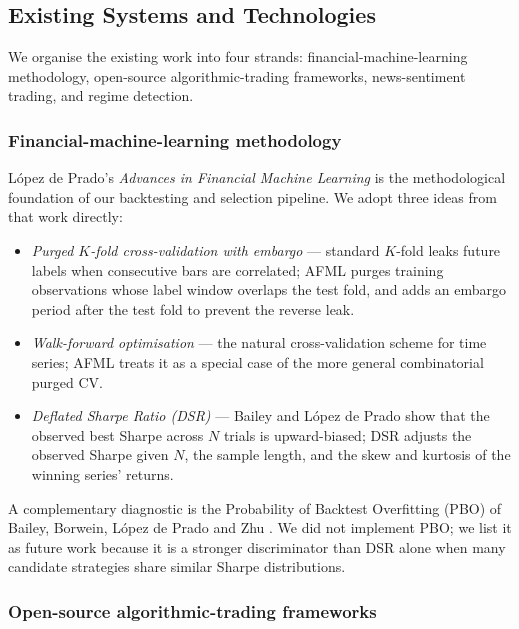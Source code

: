 \documentclass[a4paper, 12pt, titlepage]{article}
\begin{document}
\subsection{Existing Systems and Technologies}

We organise the existing work into four strands: financial-machine-learning
methodology, open-source algorithmic-trading frameworks, news-sentiment
trading, and regime detection.

\subsubsection*{Financial-machine-learning methodology}

López de Prado's \emph{Advances in Financial Machine Learning}
\cite{lopezdeprado2018afml} is the methodological foundation of our
backtesting and selection pipeline. We adopt three ideas from that
work directly:

\begin{itemize}[noitemsep]
    \item \emph{Purged $K$-fold cross-validation with embargo} ---
    standard $K$-fold leaks future labels when consecutive bars are
    correlated; AFML purges training observations whose label window
    overlaps the test fold, and adds an embargo period after the
    test fold to prevent the reverse leak.
    \item \emph{Walk-forward optimisation} --- the natural
    cross-validation scheme for time series; AFML treats it as a
    special case of the more general combinatorial purged CV.
    \item \emph{Deflated Sharpe Ratio (DSR)} --- Bailey and López de
    Prado \cite{bailey2014deflated} show that the observed best
    Sharpe across $N$ trials is upward-biased; DSR adjusts the
    observed Sharpe given $N$, the sample length, and the skew and
    kurtosis of the winning series' returns.
\end{itemize}

A complementary diagnostic is the Probability of Backtest Overfitting
(PBO) of Bailey, Borwein, López de Prado and Zhu
\cite{bailey2017probability}. We did not implement PBO; we list it as
future work because it is a stronger discriminator than DSR alone
when many candidate strategies share similar Sharpe distributions.

\subsubsection*{Open-source algorithmic-trading frameworks}
\end{document}

